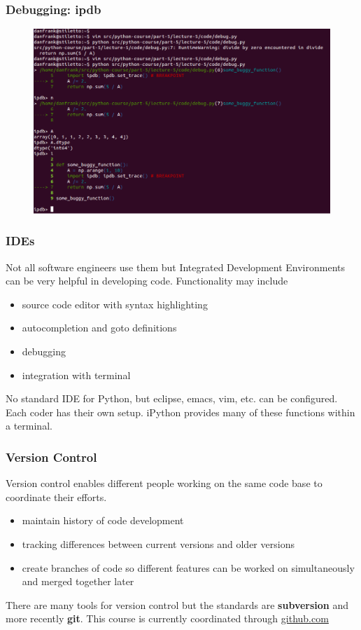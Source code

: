 \documentclass{beamer}
\begin{document}
\begin{frame}
\frametitle{Debugging: ipdb}
\begin{figure}[h]
\centering
\includegraphics[width=.9\textwidth]{images/debug.png}
\end{figure}
\end{frame}



\begin{frame}
\frametitle{IDEs}
Not all software engineers use them but Integrated Development Environments can be very helpful in developing code. Functionality may include
\begin{itemize}
\setlength{\itemsep}{0.1in}
\item{source code editor with syntax highlighting}
\item{autocompletion and goto definitions}
\item{debugging}
\item{integration with terminal}
\end{itemize}
No standard IDE for Python, but eclipse, emacs, vim, etc. can be configured. Each coder has their own setup. iPython provides many of these functions within a terminal.
\end{frame}

\begin{frame}
\frametitle{Version Control}
Version control enables different people working on the same code base to coordinate their efforts.
\begin{itemize}
\setlength{\itemsep}{0.1in}
\item{maintain history of code development}
\item{tracking differences between current versions and older versions}
\item{create branches of code so different features can be worked on simultaneously and merged together later}
\end{itemize}
There are many tools for version control but the standards are \textbf{subversion} and more recently \textbf{git}. This course is currently coordinated through \url{github.com}
\end{frame}
\end{document}
